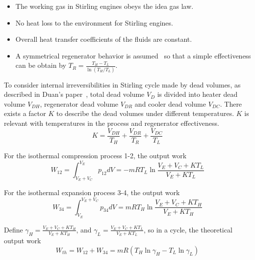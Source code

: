 \begin{itemize}
\item The working gas in Stirling engines obeys the idea gas law.
\item No heat loss to the environment for Stirling engines.
\item Overall heat transfer coefficients of the fluids are constant.
\item A symmetrical regenerator behavior is assumed~\cite{Formosa2010,Juhasz2010} so that a simple effectiveness can be obtain by $T_{R}=\frac{T_{H}-T_{L}}{\ln(T_{H}/T_{L})}$.
\end{itemize}

To consider internal irreversibilities in Stirling cycle made by dead volumes, as described in Duan's paper~\cite{Duan2014}, total dead volume $V_D$ is divided into heater dead volume $V_{DH}$, regenerator dead volume $V_{DR}$ and cooler dead volume $V_{DC}$. There exists a factor $K$ to describe the dead volumes under different temperatures. $K$ is relevant with temperatures in the process and regenerator effectiveness.
\begin{equation}
	K = \frac{V_{DH}}{T_H} + \frac{V_{DR}}{T_R} + \frac{V_{DC}}{T_L}
\end{equation}

For the isothermal compression process 1-2, the output work
\begin{equation}
	W_{12} = \int^{V_E}_{V_E+V_C}{p_{12}dV}=-mRT_L\ln{\frac{V_E+V_C+KT_L}{V_E+KT_L}}
\end{equation}

For the isothermal expansion process 3-4, the output work
\begin{equation}
	W_{34} = \int^{V_E+V_C}_{V_E}{p_{34}dV}=mRT_H\ln{\frac{V_E+V_C+KT_H}{V_E+KT_H}}
\end{equation}

Define $\gamma_H = \frac{V_E+V_C+KT_H}{V_E+KT_H}$, and $\gamma_L = \frac{V_E+V_C+KT_L}{V_E+KT_L}$, so in a cycle, the theoretical output work
\begin{equation}
	W_{th} = W_{12} + W_{34} = mR(T_H\ln\gamma_H - T_L\ln\gamma_L)
\end{equation}

